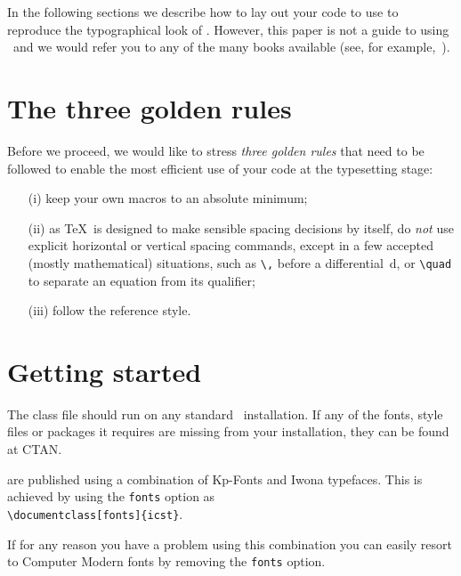 \documentclass[fonts]{icst}
\begin{document}
In the following sections we describe how to lay out your code to
use \textsf{\journalclass} to reproduce the typographical look of
\emph{\journalnamelc}. However, this paper is not a guide to
using \LaTeXe\ and we would refer you to any of the many books
available (see, for example,~\cite{R1,R2,R3}).

\section{The three golden rules}
Before we proceed, we would like to stress \emph{three golden
rules} that need to be followed to enable the most efficient use
of your code at the typesetting stage:
\begin{enumerate}
\item[(i)] keep your own macros to an absolute minimum;

\item[(ii)] as \TeX\ is designed to make sensible spacing
decisions by itself, do \emph{not} use explicit horizontal or
vertical spacing commands, except in a few accepted (mostly
mathematical) situations, such as \verb"\," before a
differential~d, or \verb"\quad" to separate an equation from its
qualifier;

\item[(iii)] follow the \emph{\journalnamelc} reference style.
\end{enumerate}

\section{Getting started}
The \textsf{\journalclassshort} class file should run
on any standard \LaTeXe\ installation. If any of the fonts, style
files or packages it requires are missing from your installation,
they can be found at CTAN.

\emph{\journalnamelc} are published using a combination of Kp-Fonts
and Iwona typefaces. This is achieved by using the \verb"fonts"
option as\\
\verb"\documentclass[fonts]{icst}".

\noindent If for any reason you have a problem using this
combination you can easily resort to Computer Modern fonts by
removing the \verb"fonts" option.
\end{document}
